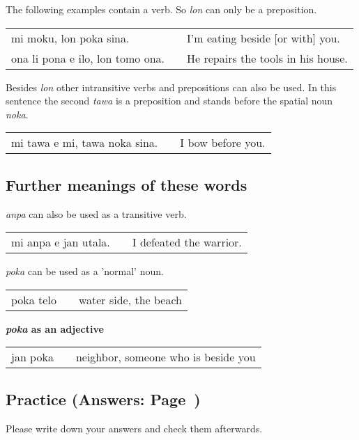 The following examples contain a verb. 
So \textit{lon} can only be a preposition. 

\begin{supertabular}{p{5,5cm}|ll}
mi moku, lon poka sina.    && I'm eating beside [or with] you. \\
ona li pona e ilo, lon tomo ona. && He repairs the tools in his house. \\
\end{supertabular} 
%
Besides \textit{lon} other intransitive verbs and prepositions can also be used. 
In this sentence the second \textit{tawa} is a preposition and stands before the spatial noun \textit{noka}. 

\begin{supertabular}{p{5,5cm}|ll}
mi tawa e mi, tawa noka sina. && I bow before you. \\
\end{supertabular} 

%
\subsection*{Further meanings of these words}

\textit{anpa} can also be used as a transitive verb.

\begin{supertabular}{p{5,5cm}|ll}
mi anpa e jan utala. && I defeated the warrior. \\
\end{supertabular} 


\textit{poka} can be used as a 'normal' noun.

\begin{supertabular}{p{5,5cm}|ll}
poka telo && water side, the beach \\
\end{supertabular} 

\textbf{\textit{poka} as an adjective} \\
\begin{supertabular}{p{5,5cm}|ll}
jan poka && neighbor, someone who is beside you \\
\end{supertabular} 
%

%
\newpage
\subsection*{Practice (Answers: Page~\pageref{'other_prepositions'})}
%
Please write down your answers and check them afterwards. 










